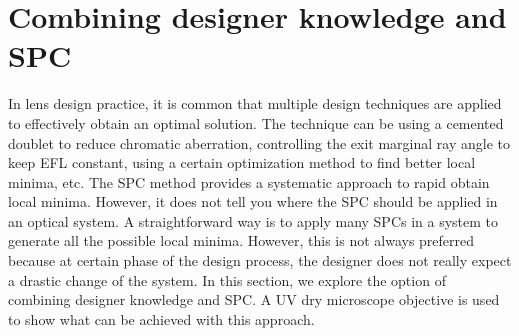 \section{Combining designer knowledge and SPC}
In lens design practice, it is common that multiple design techniques are applied to effectively obtain an optimal solution. The technique can be using a cemented doublet to reduce chromatic aberration, controlling the exit marginal ray angle to keep EFL constant, using a certain optimization method to find better local minima, etc. The SPC method provides a systematic approach to rapid obtain local minima. However, it does not tell you where the SPC should be applied in an optical system. A straightforward way is to apply many SPCs in a system to generate all the possible local minima. However, this is not always preferred because at certain phase of the design process, the designer does not really expect a drastic change of the system. In this section, we explore the option of combining designer knowledge and SPC. A UV dry microscope objective is used to show what can be achieved with this approach. 

